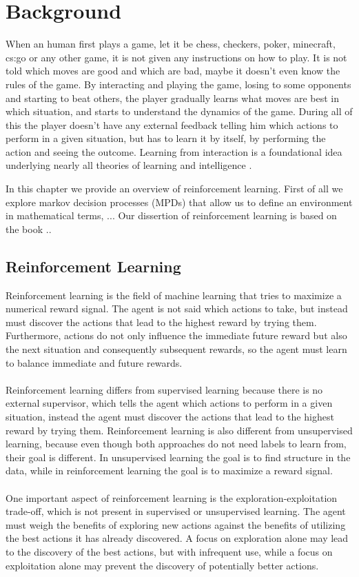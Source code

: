 \chapter{Background}
When an human first plays a game, let it be chess, checkers, poker, minecraft, cs:go or any other game, it is not given any instructions on how to play. It is not told which moves are good and which are bad, maybe it doesn't even know the rules of the game. By interacting and playing the game, losing to some opponents and starting to beat others, the player gradually learns what moves are best in which situation, and starts to understand the dynamics of the game. During all of this the player doesn't have any external feedback telling him which actions to perform in a given situation, but has to learn it by itself, by performing the action and seeing the outcome. Learning from interaction is a foundational idea underlying nearly all theories of learning and intelligence \cite{sutton-barto}.

In this chapter we provide an overview of reinforcement learning. First of all we explore markov decision processes (MPDs) that allow us to define an environment in mathematical terms, ... Our dissertion of reinforcement learning is based on the book \cite{sutton-barto}..

\section{Reinforcement Learning}
Reinforcement learning is the field of machine learning that tries to maximize a numerical reward signal. The agent is not said which actions to take, but instead must discover the actions that lead to the highest reward by trying them. Furthermore, actions do not only influence the immediate future reward but also the next situation and consequently subsequent rewards, so the agent must learn to balance immediate and future rewards.\\\\
Reinforcement learning differs from supervised learning because there is no external supervisor, which tells the agent which actions to perform in a given situation, instead the agent must discover the actions that lead to the highest reward by trying them. 
Reinforcement learning is also different from unsupervised learning, because even though both approaches do not need labels to learn from, their goal is different. In unsupervised learning the goal is to find structure in the data, while in reinforcement learning the goal is to maximize a reward signal.\\\\
One important aspect of reinforcement learning is the exploration-exploitation trade-off, which is not present in supervised or unsupervised learning. The agent must weigh the benefits of exploring new actions against the benefits of utilizing the best actions it has already discovered. A focus on exploration alone may lead to the discovery of the best actions, but with infrequent use, while a focus on exploitation alone may prevent the discovery of potentially better actions.

